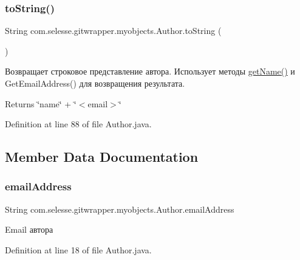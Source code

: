\subsubsection{\texorpdfstring{to\+String()}{toString()}}
{\footnotesize\ttfamily String com.\+selesse.\+gitwrapper.\+myobjects.\+Author.\+to\+String (\begin{DoxyParamCaption}{ }\end{DoxyParamCaption})}

Возвращает строковое представление автора. Использует методы \hyperlink{classcom_1_1selesse_1_1gitwrapper_1_1myobjects_1_1_author_aed9dd31a6e46a7f0aed1ac480e8abdb1}{get\+Name()} и Get\+Email\+Address() для возвращения результата.

\begin{DoxyReturn}{Returns}
\char`\"{}name\char`\"{} + \char`\"{}$<$email$>$\char`\"{} 
\end{DoxyReturn}


Definition at line 88 of file Author.\+java.



\subsection{Member Data Documentation}
\mbox{\label{classcom_1_1selesse_1_1gitwrapper_1_1myobjects_1_1_author_a69b9343309e513d43ebae1234a81b45e}} 
\subsubsection{\texorpdfstring{email\+Address}{emailAddress}}
{\footnotesize\ttfamily String com.\+selesse.\+gitwrapper.\+myobjects.\+Author.\+email\+Address\hspace{0.3cm}{\ttfamily [private]}}



Email автора 



Definition at line 18 of file Author.\+java.

\mbox{\label{classcom_1_1selesse_1_1gitwrapper_1_1myobjects_1_1_author_aa0a3b9c70dc3d85a02acf8c1241a7a0e}} 
